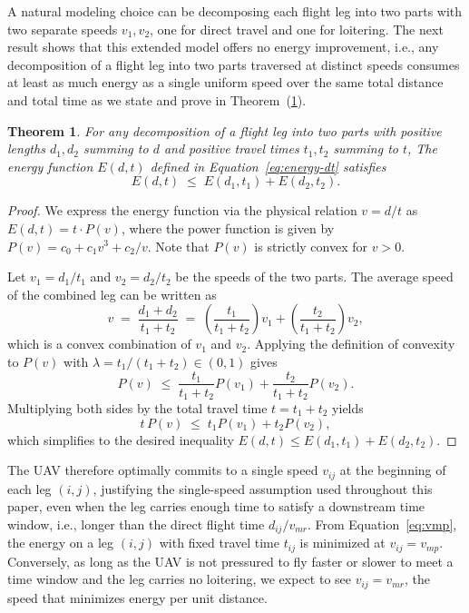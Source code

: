 \documentclass[11pt]{article}
\newtheorem{theorem}{Theorem}[section]
\begin{document}
 A natural modeling choice can be decomposing each flight leg into two parts with two separate speeds $v_1, v_2$, one for direct travel and one for loitering. The next result shows that this extended model offers no energy improvement, i.e., any decomposition of a flight leg into two parts traversed at distinct speeds consumes at least as much energy as a single uniform speed over the same total distance and total time as we state and prove in Theorem~(\ref{thm:single-speed}).
%
\begin{theorem}\label{thm:single-speed}
For any decomposition of a flight leg into two parts with positive lengths $d_1, d_2$ summing to $d$ and positive travel times $t_1, t_2$ summing to $t$, The energy function $E(d, t)$ defined in Equation~\eqref{eq:energy-dt} satisfies
\begin{equation}\label{eq:subadditive}
E(d, t) \;\le\;  E(d_1, t_1) + E(d_2, t_2).
\end{equation}
\end{theorem}
%
\begin{proof}
We express the energy function via the physical relation $v = d/t$ as $E(d, t) = t \cdot P(v)$, where the power function is given by $P(v) = c_0 + c_1 v^3 + c_2 / v$. 
Note that $P(v)$ is strictly convex for $v > 0$.

Let $v_1 = d_1/t_1$ and $v_2 = d_2/t_2$ be the speeds of the two parts. The average speed of the combined leg can be written as
\[
v \;=\; \frac{d_1 + d_2}{t_1 + t_2} \;=\; \left(\frac{t_1}{t_1 + t_2}\right) v_1 + \left(\frac{t_2}{t_1 + t_2}\right) v_2,
\]
which is a convex combination of $v_1$ and $v_2$. Applying the definition of convexity to $P(v)$ with $\lambda = t_1 / (t_1 + t_2) \in (0,1)$ gives
\[
P(v) \;\le\; \frac{t_1}{t_1 + t_2} P(v_1) + \frac{t_2}{t_1 + t_2} P(v_2).
\]
Multiplying both sides by the total travel time $t = t_1 + t_2$ yields
\[
t \, P(v) \;\le\; t_1 P(v_1) + t_2 P(v_2),
\]
which simplifies to the desired inequality $E(d, t) \le E(d_1, t_1) + E(d_2, t_2)$.
\end{proof}

\noindent

The UAV therefore optimally commits to a single speed $v_{ij}$ at the beginning of each leg $(i,j)$, justifying the single-speed assumption used throughout this paper, even when the leg carries enough time to satisfy a downstream time window, i.e., longer than the direct flight time $d_{ij}/v_{mr}$. From Equation~\eqref{eq:vmp}, the energy on a leg $(i,j)$ with fixed travel time $t_{ij}$ is minimized at $v_{ij} = v_{mp}$. Conversely, as long as the UAV is not pressured to fly faster or slower to meet a time window and the leg carries no loitering, we expect to see $v_{ij} = v_{mr}$, the speed that minimizes energy per unit distance.
\end{document}
